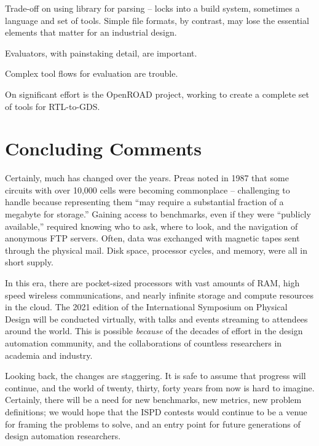 \documentclass[sigconf]{acmart}
\begin{document}
Trade-off on using library for parsing -- locks into a build
system, sometimes a language and set of tools.  Simple
file formats, by contrast, may lose the essential elements
that matter for an industrial design.

Evaluators, with painstaking detail, are important.

Complex tool flows for evaluation are trouble.

\fi



On significant effort is the OpenROAD\cite{Ajayi19} project,
working to create a complete set of tools for RTL-to-GDS.




\section{Concluding Comments}

Certainly, much has changed over the years.  Preas\cite{Preas87} noted
in 1987 that some circuits with over 10,000 cells were becoming
commonplace -- challenging to handle because representing them ``may
require a substantial fraction of a megabyte for storage.''
Gaining access to benchmarks, even if they
were ``publicly available,'' required knowing who to ask, where to
look, and the navigation of anonymous FTP servers. Often, data
was exchanged with magnetic tapes sent through the physical mail.
Disk space, processor cycles, and memory, were all in short supply.

In this era, there are pocket-sized processors with
vast amounts of RAM, high speed wireless communications, and nearly
infinite storage and compute resources in the cloud.  The 2021
edition of the International Symposium on Physical Design will
be conducted virtually, with talks and events streaming to
attendees around the world.  This is possible {\em because} of
the decades of effort in the design automation community,
and the collaborations of countless researchers in academia and
industry.

Looking back, the changes are staggering.  It is safe to assume
that progress will continue, and the world of twenty, thirty,
forty years from now is hard to imagine.  Certainly, there
will be a need for new benchmarks, new metrics, new problem
definitions; we would hope that the ISPD contests would
continue to be a venue for framing the problems to solve,
and an entry point for future generations of design automation
researchers.
\end{document}
